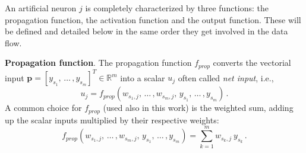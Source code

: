 \documentclass{elsarticle}
\numberwithin{equation}{section}
\theoremstyle{theorem}
\theoremstyle{definition}
\theoremstyle{remark}
\theoremstyle{proposition}
\numberwithin{figure}{section}
\begin{document}
		An artificial neuron $j$ is completely characterized by three functions: the propagation function, the activation function and the output function. These will be defined and detailed below in the same order they get involved in the data flow. 
		
		\vspace*{0.3cm}
		
		\noindent \textbf{Propagation function}. The propagation function $f_{prop}$ converts the vectorial input $\mathbf{p} = [y_{s_1}, \, \ldots \, , y_{s_m}]^T \in \mathbb{R}^m$ into a scalar $u_{j}$ often called \emph{net input}, i.e.,
		\begin{equation*}
			\label{eq:propagation-function}
			u_{j} = f_{prop}(w_{s_1,j}, \, \ldots \, , w_{s_m,j}, \, y_{s_1}, \, \ldots \, , y_{s_m}) \, .
		\end{equation*}
		A common choice for $f_{prop}$ (used also in this work) is the weighted sum, adding up the scalar inputs multiplied by their respective weights:
		\begin{equation}
			\label{eq:weighted-sum}
			f_{prop}(w_{s_1,j}, \, \ldots \, , w_{s_m,j}, \, y_{s_1}, \, \ldots \, , y_{s_m}) = \sum_{k = 1}^m w_{s_k,j} ~ y_{s_k} \, .
		\end{equation} 
		
		\vspace*{0.3cm}
		
\end{document}
